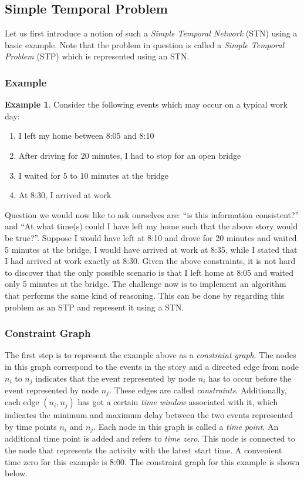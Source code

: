 \documentclass{article}
\theoremstyle{definition}
\newtheorem{example}{Example}[section]
\begin{document}
\subsection{Simple Temporal Problem}
\label{text:STN}
Let us first introduce a notion of such a \emph{Simple Temporal Network} (STN) using a basic example. 
Note that the problem in question is called a \emph{Simple Temporal Problem} (STP) which is represented using an STN.

\subsubsection{Example}
\begin{example}
\label{exmp:stn}
Consider the following events which may occur on a typical work day:
\begin{enumerate}
\item I left my home between 8:05 and 8:10
\item After driving for 20 minutes, I had to stop for an open bridge
\item I waited for 5 to 10 minutes at the bridge
\item At 8:30, I arrived at work 
\end{enumerate}
\end{example}

Question we would now like to ask ourselves are: ``is this information consistent?'' and ``At what time(s) could I have left my home such that the above story would be true?''. 
Suppose I would have left at 8:10 and drove for 20 minutes and waited 5 minutes at the bridge, I would have arrived at work at 8:35, while I stated that I had arrived at work exactly at 8:30. 
Given the above constraints, it is not hard to discover that the only possible scenario is that I left home at 8:05 and waited only 5 minutes at the bridge.
The challenge now is to implement an algorithm that performs the same kind of reasoning. This can be done by regarding this problem as an STP and represent it using a STN.

\subsubsection{Constraint Graph}
The first step is to represent the example above as a \emph{constraint graph}. 
The nodes in this graph correspond to the events in the story and a directed edge from node $n_i$ to $n_j$ indicates that the event represented by node $n_i$ has to occur before the event represented by node $n_j$.
These edges are called \emph{constraints}. Additionally, each edge $(n_i, n_j)$ has got a certain \emph{time window} associated with it, which indicates the minimum and maximum delay between the two events represented by time points $n_i$ and $n_j$. 
Each node in this graph is called a \emph{time point}. 
An additional time point is added and refers to \emph{time zero}. This node is connected to the node that represents the activity with the latest start time.
A convenient time zero for this example is 8:00.
The constraint graph for this example is shown below. 
\end{document}
